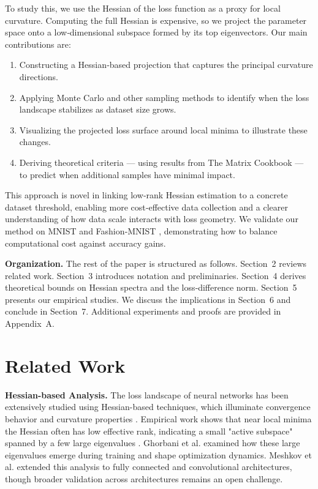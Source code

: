 \documentclass{article}
\begin{document}
To study this, we use the Hessian of the loss function as a proxy for local curvature. Computing the full Hessian is expensive, so we
project the parameter space onto a low‑dimensional subspace formed by its top eigenvectors. Our main contributions are:

\begin{enumerate}
  \item Constructing a Hessian‑based projection that captures the principal curvature directions.
  \item Applying Monte Carlo and other sampling methods to identify when the loss landscape stabilizes as dataset size grows.
  \item Visualizing the projected loss surface around local minima to illustrate these changes.
  \item Deriving theoretical criteria --- using results from The Matrix Cookbook \cite{petersen2012matrix} --- to predict when additional
        samples have minimal impact.
\end{enumerate}

This approach is novel in linking low‑rank Hessian estimation to a concrete dataset threshold, enabling more cost‑effective data
collection and a clearer understanding of how data scale interacts with loss geometry. We validate our method on MNIST
\cite{deng2012mnist} and Fashion‑MNIST \cite{xiao2017fashion}, demonstrating how to balance computational cost against accuracy gains.

\textbf{Organization.} The rest of the paper is structured as follows. Section~2 reviews related work. Section~3 introduces notation
and preliminaries. Section~4 derives theoretical bounds on Hessian spectra and the loss‐difference norm. Section~5 presents our
empirical studies. We discuss the implications in Section~6 and conclude in Section~7. Additional experiments and proofs are
provided in Appendix~A.


\section{Related Work}\label{sec:rw}

\textbf{Hessian-based Analysis.}
The loss landscape of neural networks has been extensively studied using Hessian-based techniques, which illuminate convergence
behavior and curvature properties \cite{kiselev2024unraveling}. Empirical work shows that near local minima the Hessian often has low
effective rank, indicating a small "active subspace" spanned by a few large eigenvalues \cite{sagun2018empirical}. Ghorbani et al.
\cite{ghorbani2019investigation} examined how these large eigenvalues emerge during training and shape optimization dynamics.
Meshkov et al. \cite{meshkov2024convnets} extended this analysis to fully connected and convolutional architectures, though broader
validation across architectures remains an open challenge.
\end{document}
